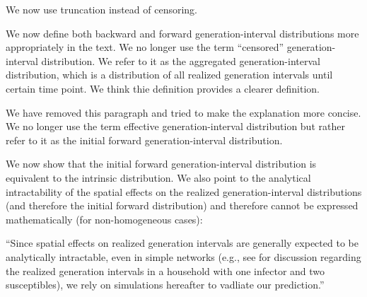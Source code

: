 We now use truncation instead of censoring.


We now define both backward and forward generation-interval distributions more appropriately in the text.
We no longer use the term ``censored'' generation-interval distribution. 
We refer to it as the aggregated generation-interval distribution, which is a distribution of all realized generation intervals until certain time point.
We think thie definition provides a clearer definition.


We have removed this paragraph and tried to make the explanation more concise.
We no longer use the term effective generation-interval distribution but rather refer to it as the initial forward generation-interval distribution.


We now show that the initial forward generation-interval distribution is equivalent to the intrinsic distribution.
We also point to the analytical intractability of the spatial effects on the realized generation-interval distributions (and therefore the initial forward distribution) and therefore cannot be expressed mathematically (for non-homogeneous cases):

``Since spatial effects on realized generation intervals are generally expected to be analytically intractable, even in simple networks (e.g., see \cite{tomba2010some} for discussion regarding the realized generation intervals in a household with one infector and two susceptibles), we rely on simulations hereafter to vadliate our prediction.''

